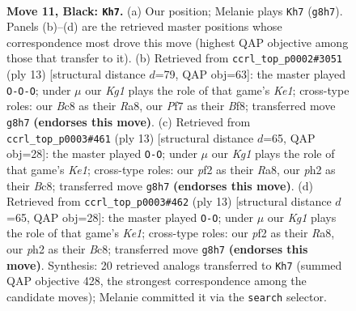 \documentclass[11pt]{article}
\begin{document}
\clearpage

\begin{figure}[p]\centering
\begin{subfigure}{0.46\textwidth}\centering
\resizebox{\linewidth}{!}{%
\newchessgame
\chessboard[
  setfen={r1b2rk1/ppppqpp1/2n1pn2/2P4p/Q2P4/2B2NP1/PP2PP1P/R3KB1R b - - 0 11},
  showmover=false,
  pgfstyle=straightmove, color=movearrow, markmove={g8-h7}
]}
\caption{}
\end{subfigure}\hfill
\begin{subfigure}{0.46\textwidth}\centering
\resizebox{\linewidth}{!}{%
\newchessgame
\chessboard[
  setfen={r3kb1r/pppqpppp/2n2n2/3p4/8/1PN1PQ1P/PBPP1PP1/R3KB1R b KQkq - 2 7},
  showmover=false,
  pgfstyle=straightmove, color=movearrow, markmove={e8-c8}
]}
\caption{}
\end{subfigure}
\\[4pt]
\begin{subfigure}{0.46\textwidth}\centering
\resizebox{\linewidth}{!}{%
\newchessgame
\chessboard[
  setfen={r1bqk2r/ppp2ppp/2n1pn2/3p4/2PP4/2P1PN2/P1Q2PPP/R1B1KB1R b KQkq - 0 7},
  showmover=false,
  pgfstyle=straightmove, color=movearrow, markmove={e8-g8}
]}
\caption{}
\end{subfigure}\hfill
\begin{subfigure}{0.46\textwidth}\centering
\resizebox{\linewidth}{!}{%
\newchessgame
\chessboard[
  setfen={r1bqk2r/ppp2ppp/2n1pn2/3p4/2PP4/2P1PN2/P1Q2PPP/R1B1KB1R b KQkq - 0 7},
  showmover=false,
  pgfstyle=straightmove, color=movearrow, markmove={e8-g8}
]}
\caption{}
\end{subfigure}
\caption{\textbf{Move 11, Black: \texttt{Kh7}.} (a) Our position; Melanie plays \texttt{Kh7} (\texttt{g8h7}). Panels (b)--(d) are the retrieved master positions whose correspondence most drove this move (highest QAP objective among those that transfer to it). (b) Retrieved from \texttt{ccrl\_top\_p0002\#3051} (ply 13) [structural distance $d$=79, QAP obj=63]: the master played \texttt{O-O-O}; under $\mu$ our \emph{Kg1} plays the role of that game's \emph{Ke1}; cross-type roles: our \emph{B}c8 as their \emph{R}a8, our \emph{P}f7 as their \emph{B}f8; transferred move \texttt{g8h7} \textbf{(endorses this move)}. (c) Retrieved from \texttt{ccrl\_top\_p0003\#461} (ply 13) [structural distance $d$=65, QAP obj=28]: the master played \texttt{O-O}; under $\mu$ our \emph{Kg1} plays the role of that game's \emph{Ke1}; cross-type roles: our \emph{p}f2 as their \emph{R}a8, our \emph{p}h2 as their \emph{B}c8; transferred move \texttt{g8h7} \textbf{(endorses this move)}. (d) Retrieved from \texttt{ccrl\_top\_p0003\#462} (ply 13) [structural distance $d$=65, QAP obj=28]: the master played \texttt{O-O}; under $\mu$ our \emph{Kg1} plays the role of that game's \emph{Ke1}; cross-type roles: our \emph{p}f2 as their \emph{R}a8, our \emph{p}h2 as their \emph{B}c8; transferred move \texttt{g8h7} \textbf{(endorses this move)}. Synthesis: 20 retrieved analogs transferred to \texttt{Kh7} (summed QAP objective 428, the strongest correspondence among the candidate moves); Melanie committed it via the \texttt{search} selector.}
\label{fig:thought-m21}
\end{figure}
\end{document}
